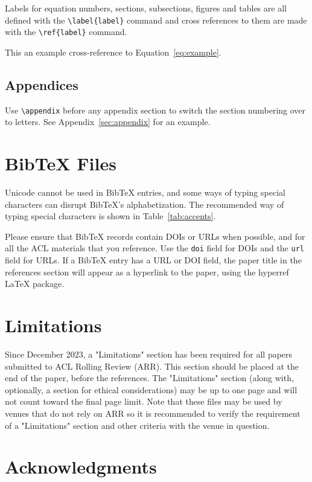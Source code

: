\documentclass[11pt]{article}
\begin{document}
Labels for equation numbers, sections, subsections, figures and tables
are all defined with the \verb|\label{label}| command and cross references
to them are made with the \verb|\ref{label}| command.

This an example cross-reference to Equation~\ref{eq:example}.

\subsection{Appendices}

Use \verb|\appendix| before any appendix section to switch the section numbering over to letters. See Appendix~\ref{sec:appendix} for an example.

\section{Bib\TeX{} Files}
\label{sec:bibtex}

Unicode cannot be used in Bib\TeX{} entries, and some ways of typing special characters can disrupt Bib\TeX's alphabetization. The recommended way of typing special characters is shown in Table~\ref{tab:accents}.

Please ensure that Bib\TeX{} records contain DOIs or URLs when possible, and for all the ACL materials that you reference.
Use the \verb|doi| field for DOIs and the \verb|url| field for URLs.
If a Bib\TeX{} entry has a URL or DOI field, the paper title in the references section will appear as a hyperlink to the paper, using the hyperref \LaTeX{} package.

\section*{Limitations}

Since December 2023, a "Limitations" section has been required for all papers submitted to ACL Rolling Review (ARR). This section should be placed at the end of the paper, before the references. The "Limitations" section (along with, optionally, a section for ethical considerations) may be up to one page and will not count toward the final page limit. Note that these files may be used by venues that do not rely on ARR so it is recommended to verify the requirement of a "Limitations" section and other criteria with the venue in question.

\section*{Acknowledgments}
\end{document}
